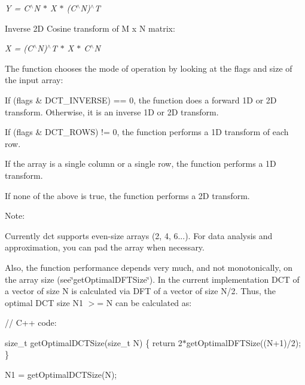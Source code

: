 {\itshape Y = C$^\wedge$N $\ast$ X $\ast$ (C$^\wedge$N)$^\wedge$T}


\begin{DoxyItemize}
\item Inverse 2D Cosine transform of {\ttfamily M x N} matrix\+: 
\end{DoxyItemize}

{\itshape X = (C$^\wedge$N)$^\wedge$T $\ast$ X $\ast$ C$^\wedge$N}

The function chooses the mode of operation by looking at the flags and size of the input array\+:


\begin{DoxyItemize}
\item If {\ttfamily (flags \& D\+C\+T\+\_\+\+I\+N\+V\+E\+R\+SE) == 0}, the function does a forward 1D or 2D transform. Otherwise, it is an inverse 1D or 2D transform. 
\item If {\ttfamily (flags \& D\+C\+T\+\_\+\+R\+O\+WS) != 0}, the function performs a 1D transform of each row. 
\item If the array is a single column or a single row, the function performs a 1D transform. 
\item If none of the above is true, the function performs a 2D transform. 
\end{DoxyItemize}

Note\+:

Currently {\ttfamily dct} supports even-\/size arrays (2, 4, 6...). For data analysis and approximation, you can pad the array when necessary.

Also, the function performance depends very much, and not monotonically, on the array size (see\char`\"{}get\+Optimal\+D\+F\+T\+Size\char`\"{}). In the current implementation D\+CT of a vector of size {\ttfamily N} is calculated via D\+FT of a vector of size {\ttfamily N/2}. Thus, the optimal D\+CT size {\ttfamily N1 $>$= N} can be calculated as\+: {\ttfamily }

{\ttfamily }

{\ttfamily }

{\ttfamily // C++ code\+:}

{\ttfamily }

{\ttfamily }

{\ttfamily size\+\_\+t get\+Optimal\+D\+C\+T\+Size(size\+\_\+t N) \{ return 2$\ast$get\+Optimal\+D\+F\+T\+Size((N+1)/2); \}}

{\ttfamily }

{\ttfamily }

{\ttfamily N1 = get\+Optimal\+D\+C\+T\+Size(\+N);}

